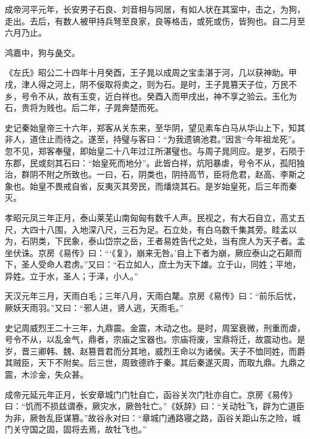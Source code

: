 \documentclass[12pt,UTF8]{ctexbook}
\begin{document}
成帝河平元年，长安男子石良、刘音相与同居，有如人状在其室中，击之，为狗，走出。去后，有数人被甲持兵弩至良家，良等格击，或死或伤，皆狗也。自二月至六月乃止。



鸿嘉中，狗与彘交。



《左氏》昭公二十四年十月癸酉，王子晁以成周之宝圭湛于河，几以获神助。甲戌，津人得之河上，阴不佞取将卖之，则为石。是时，王子晁篡天子位，万民不乡，号令不从，故有玉变，近白祥也。癸酉入而甲戌出，神不享之验云。玉化为石，贵将为贱也。后二年，子晁奔楚而死。



史记秦始皇帝三十六年，郑客从关东来，至华阴，望见素车白马从华山上下，知其非人，道住止而待之。遂至，持璧与客曰：“为我遗镐池君。”因言“今年祖龙死”。忽不见，郑客奉璧，即始皇二十八年过江所湛璧也。与周子晁同应。是岁，石陨于东郡，民或刻其石曰：“始皇死而地分”。此皆白祥，炕阳暴虐，号令不从，孤阳独治，群阴不附之所致也。一曰，石，阴类也，阴持高节，臣将危君，赵高、李斯之象也。始皇不畏戒自省，反夷灭其旁民，而燔烧其石。是岁始皇死，后三年而秦灭。



孝昭元凤三年正月，泰山莱芜山南匈匈有数千人声。民视之，有大石自立，高丈五尺，大四十八围，入地深八尺，三石为足。石立处，有白乌数千集其旁。眭孟以为，石阴类，下民象，泰山岱宗之岳，王者易姓告代之处，当有庶人为天子者。孟坐伏诛。京房《易传》曰：“‘《复》，崩来无咎。’自上下者为崩，厥应泰山之石颠而下，圣人受命人君虏。”又曰：“石立如人，庶士为天下雄。立于山，同姓；平地，异姓。立于水，圣人；于泽，小人。”



天汉元年三月，天雨白毛；三年八月，天雨白氂。京房《易传》曰：“前乐后忧，厥妖天雨羽。”又曰：“邪人进，贤人逃，天雨毛。”



史记周威烈王二十三年，九鼎震。金震，木动之也。是时，周室衰微，刑重而虐，号令不从，以乱金气，鼎者，宗庙之宝器也。宗庙将废，宝鼎将迁，故震动也。是岁，晋三卿韩、魏、赵篡晋君而分其地，威烈王命以为诸侯。天子不恤同姓，而爵其贼臣，天下不附矣。后三世，周致德祚于秦。其后秦遂灭周，而取九鼎。九鼎之震，木沴金，失众甚。



成帝元延元年正月，长安章城门门牡自亡，函谷关次门牡亦自亡。京房《易传》曰：“饥而不损兹谓泰，厥灾水，厥咎牡亡。”《妖辞》曰：“关动牡飞，辟为亡道臣为非，厥咎乱臣谋篡。”故谷永对曰：“章城门通路寝之路，函谷关距山东之险，城门关守国之固，固将去焉，故牡飞也。”
\end{document}
